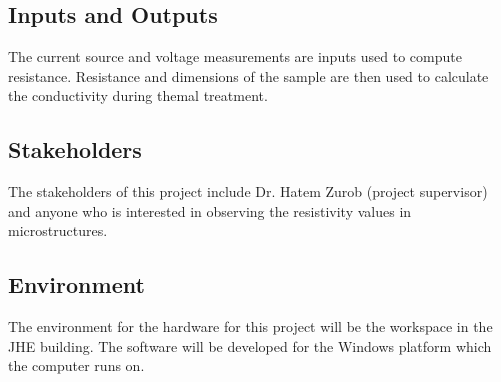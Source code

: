 \documentclass[12pt, titlepage]{article}
\begin{document}
\subsection{Inputs and Outputs}
The current source and voltage measurements are inputs used to compute resistance.
Resistance and dimensions of the sample are then used to calculate the conductivity 
during themal treatment.

\subsection{Stakeholders}
The stakeholders of this project include Dr. Hatem Zurob (project supervisor) and 
anyone who is interested in observing the resistivity values in microstructures.

\subsection{Environment}
The environment for the hardware for this project will be the workspace in the JHE building. 
The software will be developed for the Windows platform which the computer runs on.

\newpage
\end{document}
